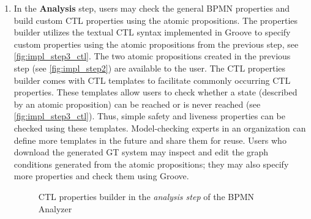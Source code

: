 \documentclass{lmcs} %
\begin{document}
\begin{enumerate}
  \item In the \textbf{Analysis} step, users may check the general BPMN properties and build custom CTL properties using the atomic propositions.
  The properties builder utilizes the textual CTL syntax implemented in Groove to specify custom properties using the atomic propositions from the previous step, see \autoref{fig:impl_step3_ctl}.
  The two atomic propositions created in the previous step (see \autoref{fig:impl_step2}) are available to the user.
  The CTL properties builder comes with CTL templates to facilitate commonly occurring CTL properties.
  These templates allow users to check whether a state (described by an atomic proposition) can be reached or is never reached (see \autoref{fig:impl_step3_ctl}).
  Thus, simple safety and liveness properties can be checked using these templates.
  Model-checking experts in an organization can define more templates in the future and share them for reuse.
  Users who download the generated GT system may inspect and edit the graph conditions generated from the atomic propositions; they may also specify more properties and check them using Groove.

  \begin{figure}[ht]
      \centering
      \caption{CTL properties builder in the \textit{analysis step} of the BPMN Analyzer}
      \label{fig:impl_step3_ctl}
  \end{figure}
  
\end{enumerate}
\end{document}
